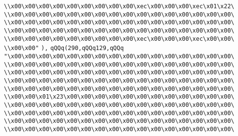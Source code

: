 \verb|\\x00\x00\x00\x00\x00\x00\x00\x00\x00\xec\x00\x00\x00\xec\x01\x22\|\newline
\verb|\\x00\x00\x00\x00\x00\x00\x00\x00\x00\x00\x00\x00\x00\x00\x00\x00\|\newline
\verb|\\x00\x00\x00\x00\x00\x00\x00\x00\x00\x00\x00\x00\x00\x00\x00\x00\|\newline
\verb|\\x00\x00\x00\x00\x00\x00\x00\x00\x00\x00\x00\x00\x00\x00\x00\x00\|\newline
\verb|\\x00\x00\x00\x00\x00\x00\x00\x00\x00\xec\x00\x00\x00\xec\x00\x00\|\newline
\verb|\\x00\x00"|\newline
\verb|),|\newline
\verb|qQQq(290,qQQq129,qQQq|\newline
\verb|"\x00\x00\x00\x00\x00\x00\x00\x00\x00\x00\x00\x00\x00\x00\x00\x00\|\newline
\verb|\\x00\x00\x00\x00\x00\x00\x00\x00\x00\x00\x00\x00\x00\x00\x00\x00\|\newline
\verb|\\x00\x00\x00\x00\x00\x00\x00\x00\x00\x00\x00\x00\x00\x00\x00\x00\|\newline
\verb|\\x00\x00\x00\x00\x00\x00\x00\x00\x00\x00\x00\x00\x00\x00\x00\x00\|\newline
\verb|\\x00\x00\x00\x00\x00\x00\x00\x00\x00\x00\x00\x00\x00\x00\x00\x00\|\newline
\verb|\\x00\x00\x01\x23\x00\x00\x00\x00\x00\x00\x00\x00\x00\x00\x00\x00\|\newline
\verb|\\x00\x00\x00\x00\x00\x00\x00\x00\x00\x00\x00\x00\x00\x00\x00\x00\|\newline
\verb|\\x00\x00\x00\x00\x00\x00\x00\x00\x00\x00\x00\x00\x00\x00\x00\x00\|\newline
\verb|\\x00\x00\x00\x00\x00\x00\x00\x00\x00\x00\x00\x00\x00\x00\x00\x00\|\newline
\verb|\\x00\x00\x00\x00\x00\x00\x00\x00\x00\x00\x00\x00\x00\x00\x00\x00\|\newline

